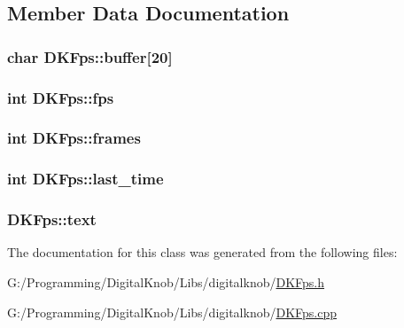 \subsection{Member Data Documentation}
\hypertarget{class_d_k_fps_a1be88e6f38d56c7d81ee46bf0f86bdbd}{
\subsubsection[{buffer}]{\setlength{\rightskip}{0pt plus 5cm}char D\-K\-Fps\-::buffer\mbox{[}20\mbox{]}}}\label{class_d_k_fps_a1be88e6f38d56c7d81ee46bf0f86bdbd}
\hypertarget{class_d_k_fps_a5f8b5f8798078286c811c47660bb0a89}{
\subsubsection[{fps}]{\setlength{\rightskip}{0pt plus 5cm}int D\-K\-Fps\-::fps}}\label{class_d_k_fps_a5f8b5f8798078286c811c47660bb0a89}
\hypertarget{class_d_k_fps_a3eb6560dcaa1a3c785529a9b4f43bdbc}{
\subsubsection[{frames}]{\setlength{\rightskip}{0pt plus 5cm}int D\-K\-Fps\-::frames}}\label{class_d_k_fps_a3eb6560dcaa1a3c785529a9b4f43bdbc}
\hypertarget{class_d_k_fps_a81fdec9aa60085f36c446adc3d91c33b}{
\subsubsection[{last\-\_\-time}]{\setlength{\rightskip}{0pt plus 5cm}int D\-K\-Fps\-::last\-\_\-time}}\label{class_d_k_fps_a81fdec9aa60085f36c446adc3d91c33b}
\hypertarget{class_d_k_fps_afccd8fe1a5768b91d5cc9bfae97a3eee}{
\subsubsection[{text}]{ D\-K\-Fps\-::text}}\label{class_d_k_fps_afccd8fe1a5768b91d5cc9bfae97a3eee}


The documentation for this class was generated from the following files\-:\begin{DoxyCompactItemize}
\item 
G\-:/\-Programming/\-Digital\-Knob/\-Libs/digitalknob/\hyperlink{_d_k_fps_8h}{D\-K\-Fps.\-h}\item 
G\-:/\-Programming/\-Digital\-Knob/\-Libs/digitalknob/\hyperlink{_d_k_fps_8cpp}{D\-K\-Fps.\-cpp}\end{DoxyCompactItemize}
